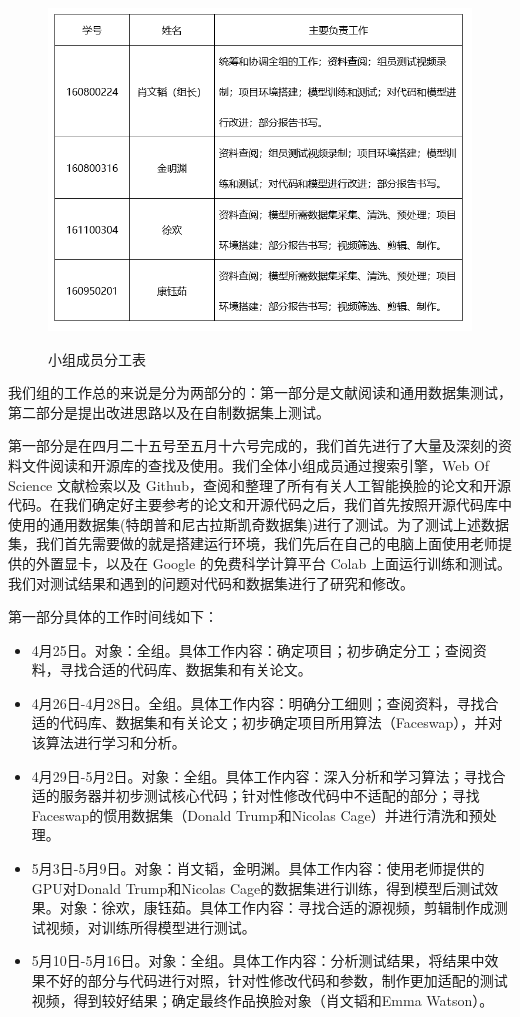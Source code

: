 \begin{figure}[h!]
	\caption{小组成员分工表}
	\centering
	\includegraphics[width=\textwidth]{work_desc.png}
	\label{work_desc}
\end{figure}


我们组的工作总的来说是分为两部分的：第一部分是文献阅读和通用数据集测试，第二部分是提出改进思路以及在自制数据集上测试。

第一部分是在四月二十五号至五月十六号完成的，我们首先进行了大量及深刻的资料文件阅读和开源库的查找及使用。我们全体小组成员通过搜索引擎，Web Of Science 文献检索以及 Github，查阅和整理了所有有关人工智能换脸的论文和开源代码。在我们确定好主要参考的论文和开源代码之后，我们首先按照开源代码库中使用的通用数据集(特朗普和尼古拉斯凯奇数据集)进行了测试。为了测试上述数据集，我们首先需要做的就是搭建运行环境，我们先后在自己的电脑上面使用老师提供的外置显卡，以及在 Google 的免费科学计算平台 Colab 上面运行训练和测试。我们对测试结果和遇到的问题对代码和数据集进行了研究和修改。


第一部分具体的工作时间线如下：

\begin{itemize}
	\item 4月25日。对象：全组。具体工作内容：确定项目；初步确定分工；查阅资料，寻找合适的代码库、数据集和有关论文。
	\item 4月26日-4月28日。全组。具体工作内容：明确分工细则；查阅资料，寻找合适的代码库、数据集和有关论文；初步确定项目所用算法（Faceswap），并对该算法进行学习和分析。
	\item 4月29日-5月2日。对象：全组。具体工作内容：深入分析和学习算法；寻找合适的服务器并初步测试核心代码；针对性修改代码中不适配的部分；寻找Faceswap的惯用数据集（Donald Trump和Nicolas Cage）并进行清洗和预处理。
	\item 5月3日-5月9日。对象：肖文韬，金明渊。具体工作内容：使用老师提供的GPU对Donald Trump和Nicolas Cage的数据集进行训练，得到模型后测试效果。对象：徐欢，康钰茹。具体工作内容：寻找合适的源视频，剪辑制作成测试视频，对训练所得模型进行测试。
	\item 5月10日-5月16日。对象：全组。具体工作内容：分析测试结果，将结果中效果不好的部分与代码进行对照，针对性修改代码和参数，制作更加适配的测试视频，得到较好结果；确定最终作品换脸对象（肖文韬和Emma Watson）。
\end{itemize}


